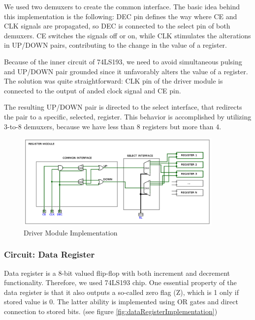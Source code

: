 We used two demuxers to create the common interface. The basic idea behind this implementation is the following: DEC pin defines the way where CE and CLK signals are propagated, so DEC is connected to the select pin of both demuxers. CE switches the signals off or on, while CLK stimulates the alterations in UP/DOWN pairs, contributing to the change in the value of a register. 

Because of the inner circuit of 74LS193, we need to avoid simultaneous pulsing and UP/DOWN pair grounded since it unfavorably alters the value of a register. The solution was quite straightforward: CLK pin of the driver module is connected to the output of anded clock signal and CE pin. 

The resulting UP/DOWN pair is directed to the select interface, that redirects the pair to a specific, selected, register. This behavior is accomplished by utilizing 3-to-8 demuxers, because we have less than 8 registers but more than 4.

\begin{figure}[H]
	\centering
	\includegraphics[width=0.9\textwidth]{img/driver_module_implementation}
	\caption{Driver Module Implementation}
	\label{fig:driverModuleImplementation}
\end{figure}



\subsubsection{Circuit: Data Register}
Data register is a 8-bit valued flip-flop with both increment and decrement functionality. Therefore, we used 74LS193 chip. One essential property of the data register is that it also outputs a so-called zero flag (Z), which is 1 only if stored value is 0. The latter ability is implemented using OR gates and direct connection to stored bits. (see figure \ref{fig:dataRegisterImplementation})

